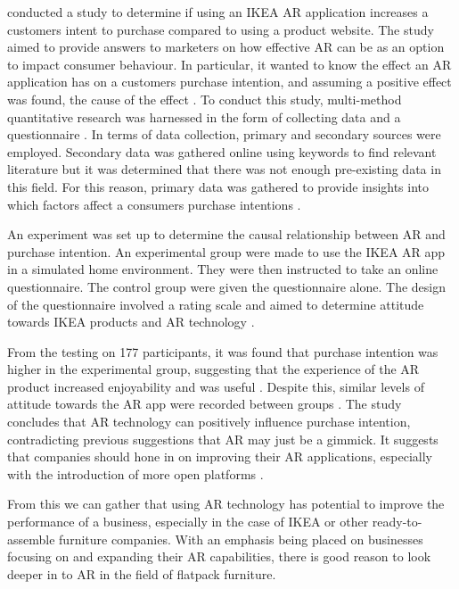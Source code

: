 \documentclass{l4proj}
\begin{document}
\cite{raska_influence_2017} conducted a study to determine if using an IKEA AR application increases a customers intent to purchase compared to using a product website. The study aimed to provide answers to marketers on how effective AR can be as an option to impact consumer behaviour. In particular, it wanted to know the effect an AR application has on a customers purchase intention, and assuming a positive effect was found, the cause of the effect \citep{raska_influence_2017}. To conduct this study, multi-method quantitative research was harnessed in the form of collecting data and a questionnaire \citep{raska_influence_2017}. In terms of data collection, primary and secondary sources were employed. Secondary data was gathered online using keywords to find relevant literature but it was determined that there was not enough pre-existing data in this field. For this reason, primary data was gathered to provide insights into which factors affect a consumers purchase intentions \citep{raska_influence_2017}. 

An experiment was set up to determine the causal relationship between AR and purchase intention. An experimental group were made to use the IKEA AR app in a simulated home environment. They were then instructed to take an online questionnaire. The control group were given the questionnaire alone. The design of the questionnaire involved a rating scale and aimed to determine attitude towards IKEA products and AR technology \citep{raska_influence_2017}.

From the testing on 177 participants, it was found that purchase intention was higher in the experimental group, suggesting that the experience of the AR product increased enjoyability and was useful \citep{raska_influence_2017}. Despite this, similar levels of attitude towards the AR app were recorded between groups \citep{raska_influence_2017}. The study concludes that AR technology can positively influence purchase intention, contradicting previous suggestions that AR may just be a gimmick. It suggests that companies should hone in on improving their AR applications, especially with the introduction of more open platforms \citep{raska_influence_2017}.

From this we can gather that using AR technology has potential to improve the performance of a business, especially in the case of IKEA or other ready-to-assemble furniture companies. With an emphasis being placed on businesses focusing on and expanding their AR capabilities, there is good reason to look deeper in to AR in the field of flatpack furniture. %
\end{document}
